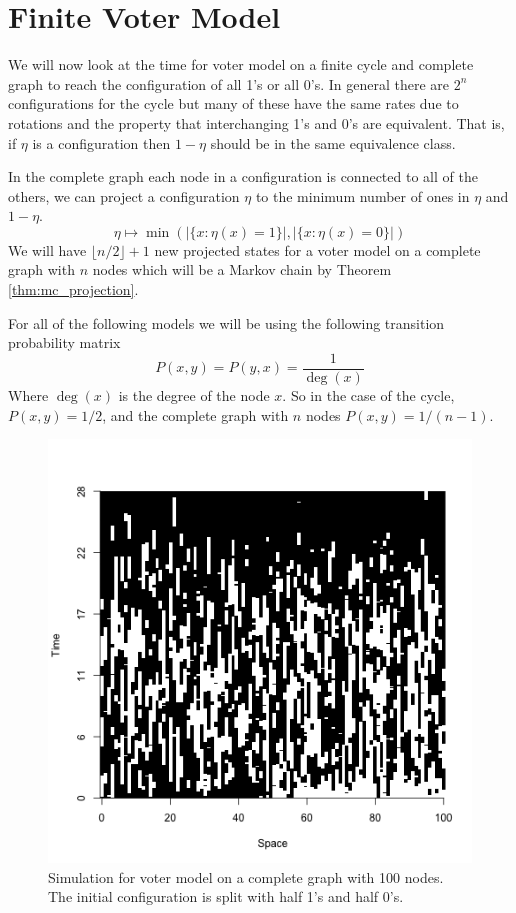 \section{Finite Voter Model}
We will now look at the time for voter model on a finite cycle and complete graph to reach the configuration of all 1's or all 0's.
In general there are $2^n$ configurations for the cycle but many of these have the same rates due to rotations and the property that interchanging 1's and 0's are equivalent.
That is, if $\eta$ is a configuration then $1 - \eta$ should be in the same equivalence class.

In the complete graph each node in a configuration is connected to all of the others, we can project a configuration $\eta$ to the minimum number of ones in $\eta$ and $1 - \eta$.
$$
\eta \mapsto \min\left(|\{x : \eta(x) = 1\}|, |\{x : \eta(x) = 0\}|  \right)
$$
We will have $\lfloor n/2 \rfloor + 1$ new projected states for a voter model on a complete graph with $n$ nodes which will be a Markov chain
by Theorem \ref{thm:mc_projection}.

For all of the following models we will be using the following transition probability matrix
$$
P(x,y) = P(y,x) = \frac{1}{\deg(x)}
$$
Where $\deg(x)$ is the degree of the node $x$.
So in the case of the cycle, $P(x,y) = 1/2$, and the complete graph with $n$ nodes $P(x,y) = 1/(n - 1)$.

\begin{figure}[H]
  \centering
    \includegraphics[width=.80\textwidth]{figures/voter_simulation_1d_complete_split_100.png}
   \caption{Simulation for voter model on a complete graph with 100 nodes. The initial configuration is split with half 1's and half 0's.}
  \label{fig:voter_sim_1d_complete.png}
\end{figure}

